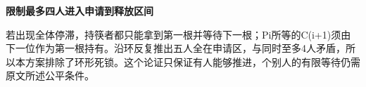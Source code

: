 {\color{ink}\bfseries 限制最多四人进入申请到释放区间}\par\vspace{1bp}若出现全体停滞，持筷者都只能拿到第一根并等待下一根；Pi所等的C(i+\allowbreak{}1)须由下一位作为第一根持有。沿环反复推出五人全在申请区，与同时至多4人矛盾，所以本方案排除了环形死锁。这个论证只保证有人能够推进，个别人的有限等待仍需原文所述公平条件。
